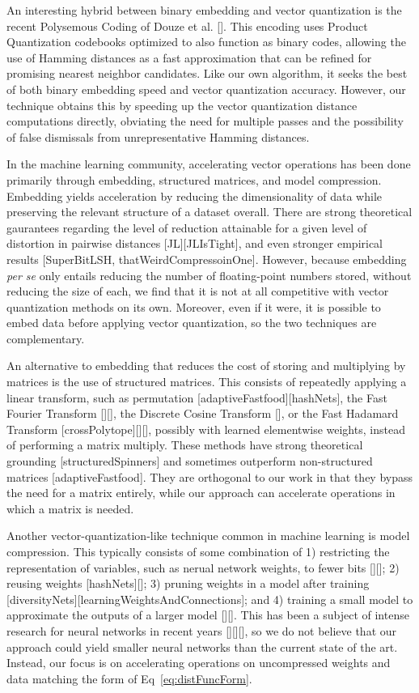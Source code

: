 An interesting hybrid between binary embedding and vector quantization is the recent Polysemous Coding of Douze et al. []. This encoding uses Product Quantization codebooks optimized to also function as binary codes, allowing the use of Hamming distances as a fast approximation that can be refined for promising nearest neighbor candidates. Like our own algorithm, it seeks the best of both binary embedding speed and vector quantization accuracy. However, our technique obtains this by speeding up the vector quantization distance computations directly, obviating the need for multiple passes and the possibility of false dismissals from unrepresentative Hamming distances.

In the machine learning community, accelerating vector operations has been done primarily through embedding, structured matrices, and model compression. Embedding yields acceleration by reducing the dimensionality of data while preserving the relevant structure of a dataset overall. There are strong theoretical gaurantees regarding the level of reduction attainable for a given level of distortion in pairwise distances [JL][JLIsTight], and even stronger empirical results [SuperBitLSH, thatWeirdCompressoinOne]. However, because embedding \textit{per se} only entails reducing the number of floating-point numbers stored, without reducing the size of each, we find that it is not at all competitive with vector quantization methods on its own. Moreover, even if it were, it is possible to embed data before applying vector quantization, so the two techniques are complementary.

An alternative to embedding that reduces the cost of storing and multiplying by matrices is the use of structured matrices. This consists of repeatedly applying a linear transform, such as permutation [adaptiveFastfood][hashNets], the Fast Fourier Transform [][], the Discrete Cosine Transform [], or the Fast Hadamard Transform [crossPolytope][][], possibly with learned elementwise weights, instead of performing a matrix multiply. These methods have strong theoretical grounding [structuredSpinners] and sometimes outperform non-structured matrices [adaptiveFastfood]. They are orthogonal to our work in that they bypass the need for a matrix entirely, while our approach can accelerate operations in which a matrix is needed.

Another vector-quantization-like technique common in machine learning is model compression. This typically consists of some combination of 1) restricting the representation of variables, such as nerual network weights, to fewer bits [][]; 2) reusing weights [hashNets][]; 3) pruning weights in a model after training [diversityNets][learningWeightsAndConnections]; and 4) training a small model to approximate the outputs of a larger model [][]. This has been a subject of intense research for neural networks in recent years [][][], so we do not believe that our approach could yield smaller neural networks than the current state of the art. Instead, our focus is on accelerating operations on uncompressed weights and data matching the form of Eq~\ref{eq:distFuncForm}.

